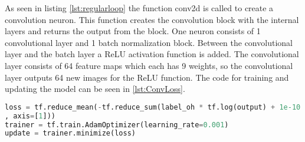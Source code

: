 As seen in listing \ref{lst:regularloop} the function conv2d is called to create a convolution neuron. This function creates the convolution block with the internal layers and returns the output from the block. One neuron consists of 1 convolutional layer and 1 batch normalization block. Between the convolutional layer and the batch layer a ReLU activation function is added. The convolutional layer consists of 64 feature maps which each has 9 weights, so the convolutional layer outputs 64 new images for the ReLU function. The code for training and updating the model can be seen in \ref{lst:ConvLoss}.

\begin{lstlisting}[language=Python, label=lst:ConvLoss, caption= Implementation of learning rate type ADAM]
loss = tf.reduce_mean(-tf.reduce_sum(label_oh * tf.log(output) + 1e-10
, axis=[1]))
trainer = tf.train.AdamOptimizer(learning_rate=0.001)
update = trainer.minimize(loss)
\end{lstlisting}